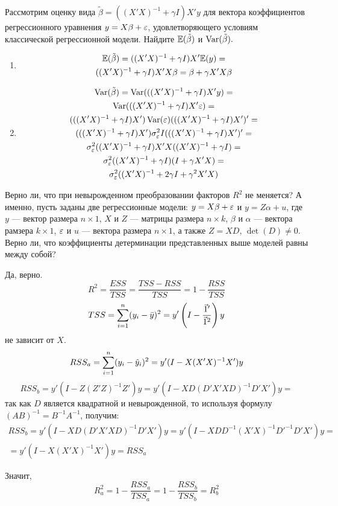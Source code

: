 \begin{problem}
Рассмотрим оценку вида $\tilde{\beta} = ((X'X)^{-1} + \gamma I)X'y$ для вектора коэффициентов регрессионного уравнения $y = X\beta + \varepsilon$, удовлетворяющего условиям классической регрессионной модели. Найдите $\mathbb{E}(\tilde{\beta})$ и $\operatorname{Var}(\tilde{\beta}).$


\begin{sol}
\begin{enumerate}
\item
\begin{multline*}
\mathbb{E}(\tilde{\beta}) = ((X'X)^{-1} + \gamma I)X'\mathbb{E}(y) = \\
 ((X'X)^{-1} + \gamma I)X'X\beta = \beta + \gamma X'X\beta
\end{multline*}
\item
\begin{multline*}
\operatorname{Var}(\tilde{\beta}) = \operatorname{Var}(((X'X)^{-1} + \gamma I)X'y) = \\
 \operatorname{Var}(((X'X)^{-1} + \gamma I)X'\varepsilon) = \\
 (((X'X)^{-1} + \gamma I)X')\operatorname{Var}(\varepsilon)(((X'X)^{-1} + \gamma I)X')'=  \\
  (((X'X)^{-1} + \gamma I)X')\sigma_{\varepsilon}^2 I(((X'X)^{-1} + \gamma I)X')'= \\
  \sigma_{\varepsilon}^2((X'X)^{-1} + \gamma I)X'X((X'X)^{-1} + \gamma I) = \\
  \sigma_{\varepsilon}^2((X'X)^{-1} + \gamma I)(I + \gamma X'X) =\\
   \sigma_{\varepsilon}^2((X'X)^{-1} + 2\gamma I + \gamma ^2 X'X)
\end{multline*}
\end{enumerate}
\end{sol}
\end{problem}




\begin{problem}
Верно ли, что при невырожденном преобразовании факторов $R^2$ не меняется? А именно, пусть заданы две регрессионные модели: $y = X\beta + \varepsilon$ и $y = Z\alpha + u$, где $y$ — вектор размера $n \times 1$, $X$ и $Z$ — матрицы размера $n \times k$, $\beta$ и $\alpha$ — вектора рамзера $k \times 1$, $\varepsilon$ и $u$ — вектора размера $n \times 1$, а также $Z=XD$, $\det(D) \not= 0.$ Верно ли, что коэффициенты детерминации представленных выше моделей равны между собой?

\begin{sol}
Да, верно.
\[R^2=\frac{ESS}{TSS}=\frac{TSS-RSS}{TSS}=1-\frac{RSS}{TSS}\]
\[TSS=\sum_{i=1}^n(y_i-\bar y)^2=y'\left(I-\frac{\v1'}{\v1^2}\right)y\]
не зависит от $X$.
\[RSS_a=\sum_{i=1}^n(y_i-\hat{y}_i)^2=y'(I-X(X'X)^{-1}X')y\]
\[RSS_b=y'(I-Z(Z'Z)^{-1}Z')y=y'(I-XD(D'X'XD)^{-1}D'X')y=\]
так как $D$ является квадратной и невырожденной, то используя формулу $(AB)^{-1}=B^{-1}A^{-1}$, получим:
\begin{multline*}
RSS_b=y'(I-XD(D'X'XD)^{-1}D'X')y=y'(I-XDD^{-1}(X'X)^{-1}D'^{-1}D'X')y=\\=y'(I-X(X'X)^{-1}X')y=RSS_a
\end{multline*}

Значит,
\[R^2_a=1-\frac{RSS_a}{TSS_a}=1-\frac{RSS_b}{TSS_b}=R^2_b\]
\end{sol}
\end{problem}



